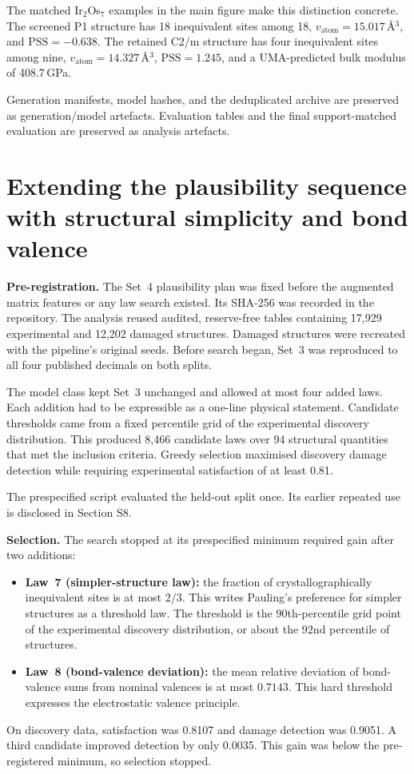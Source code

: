 The matched Ir$_2$Os$_7$ examples in the main figure make this distinction
concrete. The screened P1 structure has 18 inequivalent sites among 18,
\(v_{\mathrm{atom}}=15.017\)\,\AA$^3$, and \(\mathrm{PSS}=-0.638\). The retained
C2/m structure has four inequivalent sites among nine,
\(v_{\mathrm{atom}}=14.327\)\,\AA$^3$, \(\mathrm{PSS}=1.245\), and a UMA-predicted
bulk modulus of 408.7\,GPa.

Generation manifests, model hashes, and the deduplicated archive are preserved
as generation/model artefacts. Evaluation tables and the final support-matched
evaluation are preserved as analysis artefacts.

\section{Extending the plausibility sequence with structural simplicity and bond valence}\label{note:s17}\label{si-note:s17}

\textbf{Pre-registration.} The Set~4 plausibility plan was fixed before the
augmented matrix features or any law search existed. Its SHA-256 was recorded in
the repository. The analysis reused audited, reserve-free tables containing
17,929 experimental and 12,202 damaged structures. Damaged structures were
recreated with the pipeline's original seeds. Before search began, Set~3 was
reproduced to all four published decimals on both splits.

The model class kept Set~3 unchanged and allowed at most four added laws. Each
addition had to be expressible as a one-line physical statement. Candidate
thresholds came from a fixed percentile grid of the experimental discovery
distribution. This produced 8{,}466 candidate laws over 94 structural quantities
that met the inclusion criteria. Greedy selection maximised discovery damage
detection while requiring experimental satisfaction of at least 0.81.

The prespecified script evaluated the held-out split once. Its earlier repeated
use is disclosed in Section S8.

\textbf{Selection.} The search stopped at its prespecified minimum required gain after two additions:
\begin{itemize}
\item \textbf{Law~7 (simpler-structure law):} the fraction of
crystallographically inequivalent sites is at most $2/3$. This writes Pauling's
preference for simpler structures as a threshold law. The threshold is the
90th-percentile grid point of the experimental discovery distribution, or about
the 92nd percentile of structures.
\item \textbf{Law~8 (bond-valence deviation):} the mean relative deviation of
bond-valence sums from nominal valences is at most $0.7143$. This hard threshold
expresses the electrostatic valence principle.
\end{itemize}
On discovery data, satisfaction was 0.8107 and damage detection was 0.9051. A
third candidate improved detection by only 0.0035. This gain was below the
pre-registered minimum, so selection stopped.

